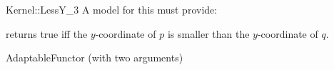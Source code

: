 \begin{ccRefFunctionObjectConcept}{Kernel::LessY_3}
A model for this must provide:


{returns true iff the $y$-coordinate of $p$ is smaller than the
$y$-coordinate of $q$.}

\ccRefines
AdaptableFunctor (with two arguments)

\ccSeeAlso
{}\\

\end{ccRefFunctionObjectConcept}
